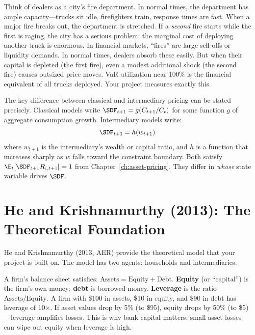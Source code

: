 \begin{intuition}
Think of dealers as a city's fire department. In normal times, the department has ample capacity---trucks sit idle, firefighters train, response times are fast. When a major fire breaks out, the department is stretched. If a \emph{second} fire starts while the first is raging, the city has a serious problem: the marginal cost of deploying another truck is enormous. In financial markets, ``fires'' are large sell-offs or liquidity demands. In normal times, dealers absorb these easily. But when their capital is depleted (the first fire), even a modest additional shock (the second fire) causes outsized price moves. VaR utilization near 100\% is the financial equivalent of all trucks deployed. Your project measures exactly this.
\end{intuition}

The key difference between classical and intermediary pricing can be stated precisely. Classical models write $\SDF_{t+1} = g(C_{t+1}/C_t)$ for some function $g$ of aggregate consumption growth. Intermediary models write:
\begin{equation}
\SDF_{t+1} = h(w_{t+1})
\label{eq:intermediary-sdf-general}
\end{equation}
where $w_{t+1}$ is the intermediary's wealth or capital ratio, and $h$ is a function that increases sharply as $w$ falls toward the constraint boundary. Both satisfy $\E_t[\SDF_{t+1} R_{i,t+1}] = 1$ from Chapter~\ref{ch:asset-pricing}. They differ in \emph{whose} state variable drives $\SDF$.

\section{He and Krishnamurthy (2013): The Theoretical Foundation}
\label{sec:he-krishnamurthy}

He and Krishnamurthy (2013, AER) provide the theoretical model that your project is built on. The model has two agents: households and intermediaries.

\begin{prereq}
A firm's balance sheet satisfies: $\text{Assets} = \text{Equity} + \text{Debt}$. \textbf{Equity} (or ``capital'') is the firm's own money; \textbf{debt} is borrowed money. \textbf{Leverage} is the ratio $\text{Assets}/\text{Equity}$. A firm with \$100 in assets, \$10 in equity, and \$90 in debt has leverage of 10$\times$. If asset values drop by 5\% (to \$95), equity drops by 50\% (to \$5)---leverage amplifies losses. This is why bank capital matters: small asset losses can wipe out equity when leverage is high.
\end{prereq}

